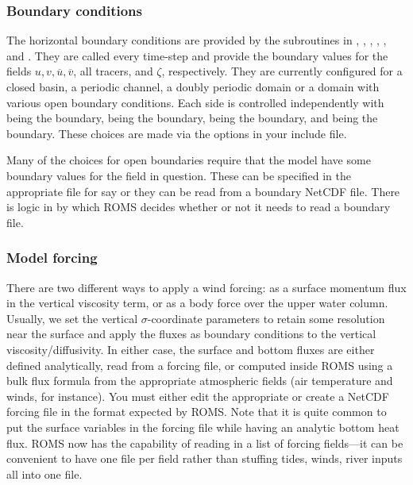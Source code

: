 \subsubsection{Boundary conditions}
\label{Bcs}
The horizontal boundary conditions are provided by the subroutines
in , , , ,
, and .  They are called every time-step
and provide the boundary values for the fields $u, v, \overline{u},
\overline{v}$, all tracers, and $\zeta$, respectively. They are currently
configured for a closed basin, a periodic channel, a doubly periodic
domain or a domain with various open boundary conditions. Each side is
controlled independently with  being the  boundary,
 being the  boundary,  being the 
boundary, and  being the  boundary. These choices are
made via the  options in your include file.

Many of the choices for open boundaries require that the model have
some boundary values for the field in question. These can be specified in
the appropriate  file for say  or
they can be read from a boundary NetCDF file. There is logic in
 by which ROMS decides whether or not it needs to
read a boundary file.

\subsubsection{Model forcing}
\label{Mforce}

There are two different ways to apply a wind forcing: as a surface
momentum flux in the vertical viscosity term, or as a body force over
the upper water column.
Usually, we set the vertical $\sigma$-coordinate
parameters to retain some resolution near the surface and apply the
fluxes as boundary conditions to the vertical viscosity/diffusivity.
In either case, the surface and bottom fluxes are either defined
analytically, read from a forcing file, or computed inside ROMS
using a bulk flux formula from the appropriate atmospheric fields
(air temperature and winds, for instance).  You must either edit the
appropriate  or create a NetCDF forcing
file in the format expected by ROMS. Note that it is quite common
to put the surface variables in the forcing file while having an analytic
bottom heat flux. ROMS now has the capability of reading in a list
of forcing fields---it can be convenient to have one file per field
rather than stuffing tides, winds, river inputs all into one file.

